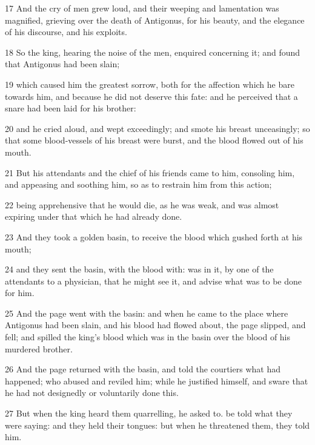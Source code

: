 \par 17 And the cry of men grew loud, and their weeping and lamentation was magnified, grieving over the death of Antigonus, for his beauty, and the elegance of his discourse, and his exploits. 

\par 18 So the king, hearing the noise of the men, enquired concerning it; and found that Antigonus had been slain; 

\par 19 which caused him the greatest sorrow, both for the affection which he bare towards him, and because he did not deserve this fate: and he perceived that a snare had been laid for his brother: 

\par 20 and he cried aloud, and wept exceedingly; and smote his breast unceasingly; so that some blood-vessels of his breast were burst, and the blood flowed out of his mouth. 

\par 21 But his attendants and the chief of his friends came to him, consoling him, and appeasing and soothing him, so as to restrain him from this action; 

\par 22 being apprehensive that he would die, as he was weak, and was almost expiring under that which he had already done. 

\par 23 And they took a golden basin, to receive the blood which gushed forth at his mouth; 

\par 24 and they sent the basin, with the blood with: was in it, by one of the attendants to a physician, that he might see it, and advise what was to be done for him. 

\par 25 And the page went with the basin: and when he came to the place where Antigonus had been slain, and his blood had flowed about, the page slipped, and fell; and spilled the king’s blood which was in the basin over the blood of his murdered brother. 

\par 26 And the page returned with the basin, and told the courtiers what had happened; who abused and reviled him; while he justified himself, and sware that he had not designedly or voluntarily done this. 

\par 27 But when the king heard them quarrelling, he asked to. be told what they were saying: and they held their tongues: but when he threatened them, they told him. 


